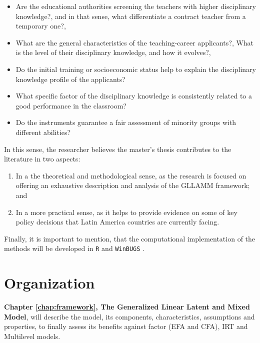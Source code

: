\begin{itemize}
	\item Are the educational authorities screening the teachers with higher disciplinary knowledge?, and in that sense, what differentiate a contract teacher from a temporary one?,
	
	\item What are the general characteristics of the teaching-career applicants?, What is the level of their disciplinary knowledge, and how it evolves?, 
	
	\item Do the initial training or socioeconomic status help to explain the disciplinary knowledge profile of the applicants?
	
	\item What specific factor of the disciplinary knowledge is consistently related to a good performance in the classroom?
	
	\item Do the instruments guarantee a fair assessment of minority groups with different abilities?
\end{itemize}

In this sense, the researcher believes the master's thesis contributes to the literature in two aspects: 

\begin{enumerate}
	\item In a the theoretical and methodological sense, as the research is focused on offering an exhaustive description and analysis of the GLLAMM framework; and 
	
	\item In a more practical sense, as it helps to provide evidence on some of key policy decisions that Latin America countries are currently facing.
\end{enumerate}

Finally, it is important to mention, that the computational implementation of the methods will be developed in {\color{red} \texttt{R} \citep{R2015} and \texttt{WinBUGS} \citep{Lunn_et_al_2000}}.



\section{Organization}

\textbf{Chapter \ref{chap:framework}, The Generalized Linear Latent and Mixed Model}, will describe the model, its components, characteristics, assumptions and properties, to finally assess its benefits against factor (EFA and CFA), IRT and Multilevel models.

